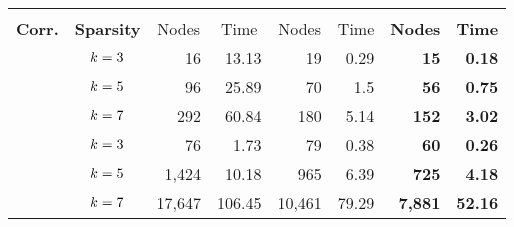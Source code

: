 \setlength{\tabcolsep}{5pt}
\begin{table}[!ht]
	\scriptsize
	\centering
    \begin{tabular}{cc||rr|rr|rr}
	\toprule
	& & \multicolumn{2}{c|}{\CPLEX{}} & \multicolumn{2}{c|}{\BNB{}} & \multicolumn{2}{c}{\BNBscr{}} \\
	\textbf{Corr.} & \textbf{Sparsity} & \multicolumn{1}{c}{Nodes} & \multicolumn{1}{c|}{Time} & \multicolumn{1}{c}{Nodes} & \multicolumn{1}{c|}{Time} & \multicolumn{1}{c}{\textbf{Nodes}} & \multicolumn{1}{c}{\textbf{Time}} \\ \midrule\midrule
    & \(k=3\) & 16 & 13.13 & 19 & 0.29 & \textbf{15} & \textbf{0.18} \\
    & \(k=5\) & 96 & 25.89 & 70 & 1.5 & \textbf{56} & \textbf{0.75} \\
    \parbox[t]{2mm}{} & \(k=7\) & 292 & 60.84 & 180 & 5.14 & \textbf{152} & \textbf{3.02} \\ \midrule
	& \(k=3\) & 76 & 1.73 & 79 & 0.38 & \textbf{60} & \textbf{0.26} \\
    & \(k=5\) & 1,424 & 10.18 & 965 & 6.39 & \textbf{725} & \textbf{4.18} \\
    \parbox[t]{2mm}{} & \(k=7\) & 17,647 & 106.45 & 10,461 & 79.29 & \textbf{7,881} & \textbf{52.16} \\ \bottomrule                      
    \end{tabular}
\end{table}
